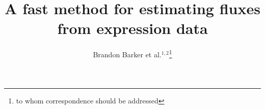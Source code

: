 \documentclass{bioinfo}
\begin{document}





\title[FALCON]{A fast method for estimating fluxes
  from expression data}
    \author[Barker \textit{et~al.}]{Brandon Barker et al.$^{1,2}$\footnote{to whom correspondence should be addressed}}

\address{$^{1}$Tri-Institutional Training Program in Computational
  Biology and Medicine, 1300 York Avenue, Box 194, New York, NY 10065\\
  $^{2}$Department of Biological Statistics and Computational Biology, 
    Cornell University, 1198 Comstock Hall, Ithaca, NY 14853-2601\\
  }


\maketitle
\end{document}
